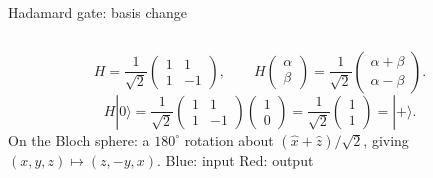 \begin{frame}{Hadamard gate: basis change}
  \begin{columns}[c]
    \[
      H=\frac{1}{\sqrt2}\begin{pmatrix}1&1\\1&-1\end{pmatrix},\qquad
      H\begin{pmatrix}\alpha\\\beta\end{pmatrix}
       =\frac{1}{\sqrt2}\begin{pmatrix}\alpha+\beta\\\alpha-\beta\end{pmatrix}.
    \]
    \[
      H|0\rangle=\frac{1}{\sqrt2}
      \begin{pmatrix}1&1\\1&-1\end{pmatrix}
      \begin{pmatrix}1\\0\end{pmatrix}
      =\frac{1}{\sqrt2}\begin{pmatrix}1\\1\end{pmatrix}=|+\rangle.
    \]
    On the Bloch sphere: a $180^\circ$ rotation about
    $(\hat x+\hat z)/\sqrt2$, giving $(x,y,z)\mapsto(z,-y,x)$.
    \centering{}
    \small Blue: input \quad Red: output
  \end{columns}
\end{frame}
